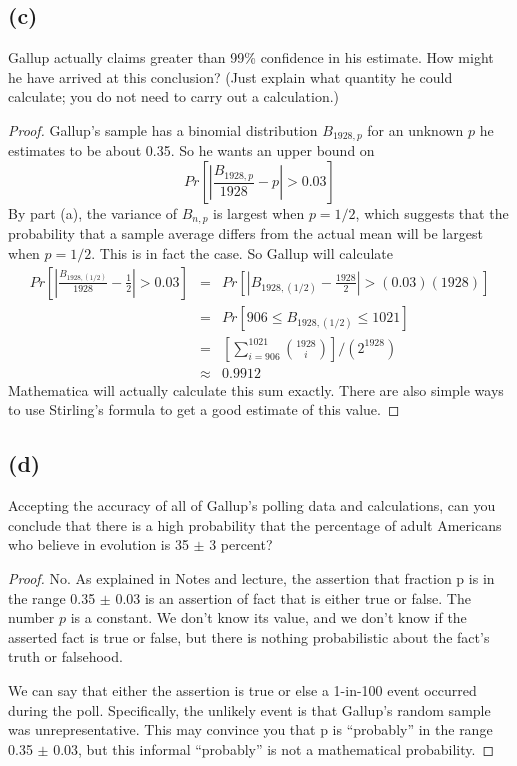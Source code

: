 \documentclass[14pt]{extarticle}
\newcommand{\dps}{\displaystyle}
\begin{document}
\subsection{(c)}
Gallup actually claims greater than 99\% confidence in his estimate. How might he have arrived at this conclusion? (Just explain what quantity he could calculate; you do not need to carry out a calculation.)

\begin{proof}
Gallup’s sample has a binomial distribution $B_{1928,p}$ for an unknown $p$ he estimates to be about 0.35. So he wants an upper bound on
$$
Pr\left[\left|\frac{B_{1928,p}}{1928} - p\right| > 0.03\right]
$$
By part (a), the variance of $B_{n,p}$ is largest when $p = 1/2$, which suggests that the probability that a sample average differs from the actual mean will be largest when $p = 1/2$. This is in fact the case. So Gallup will calculate
$$
\begin{array}{rcl}
Pr\left[\left|\frac{B_{1928,(1/2)}}{1928} - \frac{1}{2}\right| > 0.03\right]&=&Pr\left[\left|B_{1928,(1/2)} - \frac{1928}{2}\right| > (0.03)(1928)\right]\\
&=&Pr[906 \leq B_{1928,(1/2)} \leq 1021]\\
&=&\dps\left[\sum_{i = 906}^{1021}\binom{1928}{i}\right] / (2^{1928})\\
&\approx&0.9912
\end{array}
$$
Mathematica will actually calculate this sum exactly. There are also simple ways to use Stirling’s formula to get a good estimate of this value.
\end{proof}

\subsection{(d)}
Accepting the accuracy of all of Gallup’s polling data and calculations, can you conclude that there is a high probability that the percentage of adult Americans who believe in evolution is 35 $\pm$ 3 percent?

\begin{proof}
No. As explained in Notes and lecture, the assertion that fraction p is in the range 0.35 $\pm$ 0.03 is an assertion of fact that is either true or false. The number $p$ is a constant. We don’t know its value, and we don’t know if the asserted fact is true or false, but there is nothing probabilistic about the fact’s truth or falsehood.

We can say that either the assertion is true or else a 1-in-100 event occurred during the poll. Specifi­cally, the unlikely event is that Gallup’s random sample was unrepresentative. This may convince
you that p is “probably” in the range 0.35 $\pm$ 0.03, but this informal “probably” is not a mathematical probability.
\end{proof}
\end{document}
